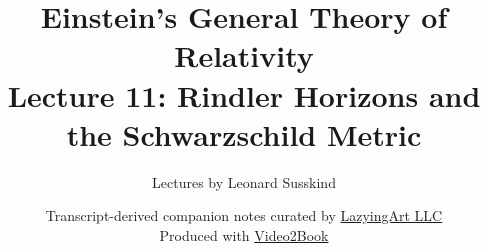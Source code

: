 \documentclass[11pt,oneside]{book}
\begin{document}
\frontmatter
\hypersetup{pageanchor=false}
\title{Einstein's General Theory of Relativity\\[0.45em]
\large Lecture 11: Rindler Horizons and the Schwarzschild Metric}
\author{Lectures by Leonard Susskind}
\date{Transcript-derived companion notes curated by
\href{https://lazying.art}{LazyingArt LLC}\\[0.35em]
\small Produced with
\href{https://github.com/lachlanchen/Video2Book}{Video2Book}}
\maketitle
\hypersetup{pageanchor=true}
\clearpage
\mainmatter

\end{document}

